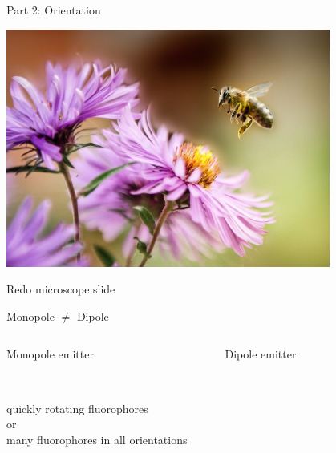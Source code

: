 \documentclass[presentation]{beamer}
\begin{document}
\begin{frame}[label=sec-1]{Part 2: Orientation}
 \begin{center}
   \includegraphics[width=0.8\textwidth]{figs/bee2.jpg}
 \end{center}
\end{frame}

\begin{frame}{Redo microscope slide}
  
\end{frame}

\begin{frame}{\centering Monopole $\neq$ Dipole}
  \vspace{1em}
  \begin{columns}
    \begin{column}{.5\textwidth}
      \centering Monopole emitter \\ \vspace{.5em}
  \end{column}
  \begin{column}{.5\textwidth}
    \centering Dipole emitter \\ \vspace{.5em}
  \end{column}    
\end{columns}
\centering
\vspace{0.5em}
\pause
{}\\ \vspace{0.5em}
quickly rotating fluorophores\\
or\\
many fluorophores in all orientations \\
\end{frame}  
\end{document}
